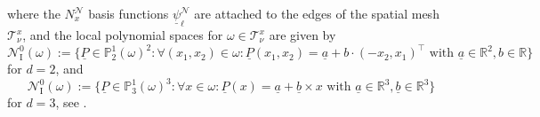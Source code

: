 \documentclass[a4paper,11pt]{article}
\newcommand{\R}{\mathbb R}
\renewcommand{\vec}[1]{\underline{#1}}
\begin{document}
where the $N_x^{\mathcal{N}}$ basis functions $\vec \psi_\ell^{\mathcal{N}}$ are attached to the edges of the spatial mesh $\mathcal T^x_\nu$, and the local polynomial spaces for $\omega \in \mathcal T^x_\nu$ are given by \begin{equation*}
	\mathcal N_\mathrm{I}^0(\omega) := \Big\{ \vec P \in \mathbb P^1_2(\omega)^2: \forall (x_1,x_2) \in \omega: \vec P(x_1,x_2) = \vec a + b \cdot (-x_2,x_1)^\top \text{ with } \vec a \in \R^2, b \in \R \Big\}
\end{equation*}
for $d=2$, and
\begin{equation*}
	\mathcal N_\mathrm{I}^0(\omega) := \Big\{ \vec P \in \mathbb P^1_3(\omega)^3: \forall x \in \omega: \vec P(x) = \vec a + \vec b \times x
	\text{ with } \vec a \in \R^3, \vec b \in \R^3 \Big\}
\end{equation*}
for $d=3$, see \cite[Section~15.1]{ErnGuermond2020I}.
\end{document}
